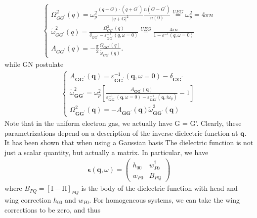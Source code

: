 \begin{align}
   \left\{\begin{array}{l}\Omega_{G G^{\prime}}^2(q)=\omega_p^2 \frac{(q+G) \cdot\left(q+G^{\prime}\right)}{|q+G|^2} \frac{n\left(G-G^{\prime}\right)}{n(0)}\overset{UEG}{=}\omega _p^2 = 4\pi n \\ \tilde{\omega}_{G G^{\prime}}^2(q)=\frac{\Omega_{G G^{\prime}}^2(q)}{\delta_{G G^{\prime}}-\varepsilon_{G G^{\prime}}^{-1}(q, \omega=0)} \overset{UEG}{=} \frac{4\pi n}{1-\varepsilon^{-1}(q, \omega=0)}
\\ A_{G G^{\prime}}(q)=-\frac{\pi}{2} \frac{\Omega_{G G^{\prime}}(q)}{\tilde{\omega}_{G G^{\prime}}(q)} .\end{array}\right. 
\end{align}
while GN postulate
\begin{align}
    \left\{\begin{array}{l}
A_{\boldsymbol{G} \boldsymbol{G}^{\prime}}(\boldsymbol{q})=\varepsilon_{\boldsymbol{G} \boldsymbol{G}^{\prime}}^{-1}(\boldsymbol{q}, \omega=0)-\delta_{\boldsymbol{G} \boldsymbol{G}^{\prime}} \\
\tilde{\omega}_{\boldsymbol{G} \boldsymbol{G}^{\prime}}^2=\omega_p^2\left[\frac{A_{\boldsymbol{G} \boldsymbol{G}^{\prime}}(\boldsymbol{q})}{\varepsilon_{\boldsymbol{G} \boldsymbol{G}^{\prime}}^{-1}(\boldsymbol{q}, \omega=0)-\varepsilon_{\boldsymbol{G} \boldsymbol{G}^{\prime}}^{-1}\left(\boldsymbol{q}, i \omega_p\right)}-1\right] \\
\Omega_{\boldsymbol{G} \boldsymbol{G}^{\prime}}^2(\boldsymbol{q})=-A_{\boldsymbol{G} \boldsymbol{G}^{\prime}}(\boldsymbol{q}) \tilde{\omega}_{\boldsymbol{G} \boldsymbol{G}^{\prime}}^2(\boldsymbol{q})
\end{array}\right.
\end{align}
Note that in the uniform electron gas, we actually have G = G'. Clearly, these parametrizations depend on a description of the inverse dielectric function at $\mathbf{q}$. It has been shown that when using a Gaussian basis The dielectric function is not just a scalar quantity, but actually a matrix. In particular, we have 
\begin{align}
    \bm{\epsilon}(\mathbf{q}, \omega) = \begin{pmatrix}
        h_{00} & w_{P 0}^{\dagger}\\
w_{P 0} & B_{P Q}
    \end{pmatrix}
\end{align}
where $B_{P Q}=[\mathrm{I}-\mathrm{\Pi}]_{P Q}$ is the body of the dielectric function with head and wing correction $h_{00}$ and $w_{P 0}$. For homogeneous systems, we can take the wing corrections to be zero, and thus

